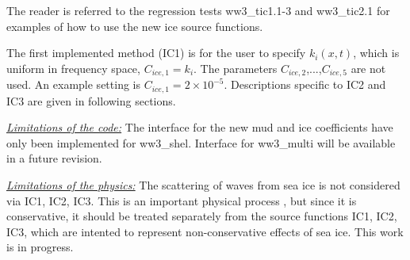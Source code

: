 The reader is referred to the regression tests {\file ww3\_tic1.1-3} and
{\file ww3\_tic2.1} for examples of how to use the new ice source functions.

The first implemented method ({\code IC1}) is for the user to specify
${k_i(x,t)}$, which is uniform in frequency space, ${C_{ice,1}}={k_i}$. The
parameters ${C_{ice,2}}$,...,${C_{ice,5}}$ are not used. An example setting
is ${C_{ice,1}}=2\times 10^{-5}$. Descriptions specific to IC2 and IC3 are given in 
following sections. 

\textrm{\textit{\underline{Limitations of the code:}}} The interface for the
new mud and ice coefficients have only been implemented for {\file
ww3\_shel}. Interface for {\file ww3\_multi} will be available in a future
revision.  

\textrm{\textit{\underline{Limitations of the physics:}}} The
scattering of waves from sea ice is not considered via {\code IC1}, {\code
IC2}, {\code IC3}. This is an important physical process \citep{art:Wad75},
but since it is conservative, it should be treated separately from the source
functions {\code IC1}, {\code IC2}, {\code IC3}, which are intented to
represent non-conservative effects of sea ice. This work is in progress.
